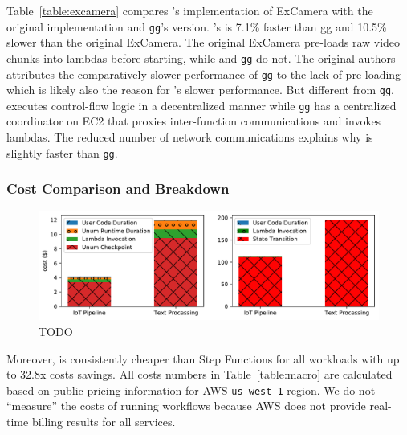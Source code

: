 
Table~\ref{table:excamera} compares \name{}'s implementation of ExCamera with
the original implementation and \texttt{gg}'s version. \name{}'s is 7.1\%
faster than gg and 10.5\% slower than the original ExCamera. The original
ExCamera pre-loads raw video chunks into lambdas before starting, while
\name{} and \texttt{gg} do not. The original authors attributes the
comparatively slower performance of \texttt{gg} to the lack of pre-loading
which is likely also the reason for \name{}'s slower performance. But
different from \texttt{gg}, \name{} executes control-flow logic in a
decentralized manner while \texttt{gg} has a centralized coordinator on EC2
that proxies inter-function communications and invokes lambdas. The reduced
number of network communications  explains why \name{} is slightly
faster than \texttt{gg}.


\subsubsection{Cost Comparison and Breakdown}

\begin{figure}[t!]
    \centering
    \includegraphics[width=\columnwidth]{figures/AppCostBreakdown.pdf}
    \caption{TODO}
    \label{fig:cost-breakdown}
\end{figure}

Moreover, \name{} is consistently cheaper than Step Functions for all
workloads with up to 32.8x costs savings. All costs numbers in
Table~\ref{table:macro} are calculated based on public pricing information for
AWS \texttt{us-west-1} region. We do not ``measure'' the costs of running
workflows because AWS does not provide real-time billing results for all
services.

